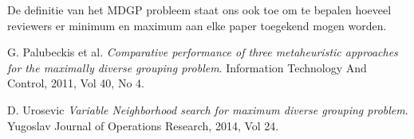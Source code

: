 \documentclass[pdftex,12pt,a4paper]{article}
\begin{document}
De definitie van het MDGP probleem staat ons ook toe om te bepalen hoeveel reviewers er minimum en maximum aan elke paper toegekend mogen worden. 

\newpage
\begin{thebibliography}{9}
  G. Palubeckis et al.
  \emph{Comparative performance of three metaheuristic approaches
for the maximally diverse grouping problem}.
  Information Technology And Control, 2011, Vol 40, No 4.
  
 D. Urosevic
 \emph{Variable Neighborhood search for maximum diverse grouping problem}.
 Yugoslav Journal of Operations Research, 2014, Vol 24.

\end{thebibliography}
\end{document}
